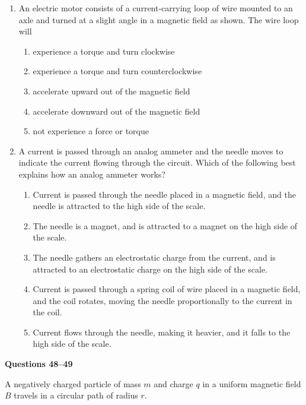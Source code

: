 \documentclass{../../oss-apphys}
\begin{document}
\begin{multicols}{2}
\begin{enumerate}[leftmargin=18pt,resume]
    \columnbreak

  \item An electric motor consists of a current-carrying loop of wire mounted
    to an axle and turned at a slight angle in a magnetic field as shown. The
    wire loop will
    
    \begin{enumerate}[noitemsep,topsep=0pt,leftmargin=18pt,label=(\Alph*)]
    \item experience a torque and turn clockwise
    \item experience a torque and turn counterclockwise
    \item accelerate upward out of the magnetic field
    \item accelerate downward out of the magnetic field
    \item not experience a force or torque
    \end{enumerate}

  \item A current is passed through an analog ammeter and the needle moves
    to indicate the current flowing through the circuit. Which of the
    following best explains how an analog ammeter works?
    \begin{enumerate}[noitemsep,topsep=0pt,leftmargin=18pt,label=(\Alph*)]
    \item Current is passed through the needle placed in a magnetic field, and
      the needle is attracted to the high side of the scale.
    \item The needle is a magnet, and is attracted to a magnet on the high side
      of the scale.
    \item The needle gathers an electrostatic charge from the current, and is
      attracted to an electrostatic charge on the high side of the scale.
    \item Current is passed through a spring coil of wire placed in a magnetic
      field, and the coil rotates, moving the needle proportionally to the
      current in the coil.
    \item Current flows through the needle, making it heavier, and it falls to
      the high side of the scale.
    \end{enumerate}
  \end{enumerate}

  \columnbreak
  
  \textbf{Questions 48--49}
  
  A negatively charged particle of mass $m$ and charge $q$ in a uniform
  magnetic field $B$ travels in a circular path of radius $r$.
  \begin{center}
  \end{center}


\end{multicols}
\end{document}

